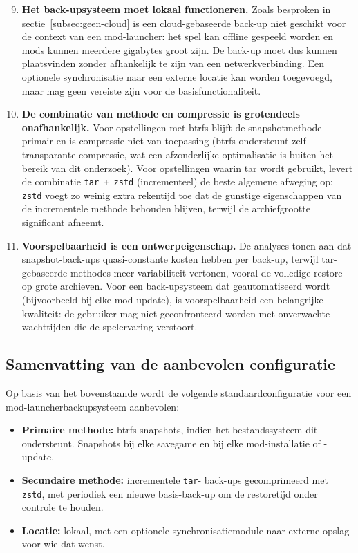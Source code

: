 \begin{enumerate}\setcounter{enumi}{8}
    \item \textbf{Het back-upsysteem moet lokaal functioneren.} Zoals besproken in sectie~\ref{subsec:geen-cloud} is een cloud-gebaseerde back-up niet geschikt voor de context van een mod-launcher: het spel kan offline gespeeld worden en mods kunnen meerdere gigabytes groot zijn. De back-up moet dus kunnen plaatsvinden zonder afhankelijk te zijn van een netwerkverbinding. Een optionele synchronisatie naar een externe locatie kan worden toegevoegd, maar mag geen vereiste zijn voor de basisfunctionaliteit.
    \item \textbf{De combinatie van methode en compressie is grotendeels onafhankelijk.} Voor opstellingen met btrfs blijft de snapshotmethode primair en is compressie niet van toepassing (btrfs ondersteunt zelf transparante compressie, wat een afzonderlijke optimalisatie is buiten het bereik van dit onderzoek). Voor opstellingen waarin tar wordt gebruikt, levert de combinatie \texttt{tar + zstd} (incrementeel) de beste algemene afweging op: \texttt{zstd} voegt zo weinig extra rekentijd toe dat de gunstige eigenschappen van de incrementele methode behouden blijven, terwijl de archiefgrootte significant afneemt.
    \item \textbf{Voorspelbaarheid is een ontwerp\-eigenschap.} De analyses tonen aan dat snapshot-back-ups quasi-constante kosten hebben per back-up, terwijl tar-gebaseerde methodes meer variabiliteit vertonen, vooral de volledige restore op grote archieven. Voor een back-upsysteem dat geautomatiseerd wordt (bijvoorbeeld bij elke mod-update), is voorspelbaarheid een belangrijke kwaliteit: de gebruiker mag niet geconfronteerd worden met onverwachte wachttijden die de spelervaring verstoort.
\end{enumerate}

\subsection{Samenvatting van de aanbevolen configuratie}

Op basis van het bovenstaande wordt de volgende standaardconfiguratie voor een mod-launcher\-back\-up\-systeem aanbevolen:

\begin{itemize}
    \item \textbf{Primaire methode:} btrfs-snapshots, indien het bestandssysteem dit ondersteunt. Snapshots bij elke savegame en bij elke mod-installatie of -update.
    \item \textbf{Secundaire methode:} incrementele \texttt{tar}- back-ups gecomprimeerd met \texttt{zstd}, met periodiek een nieuwe basis-back-up om de restoretijd onder controle te houden.
    \item \textbf{Locatie:} lokaal, met een optionele synchronisatiemodule naar externe opslag voor wie dat wenst.
\end{itemize}
